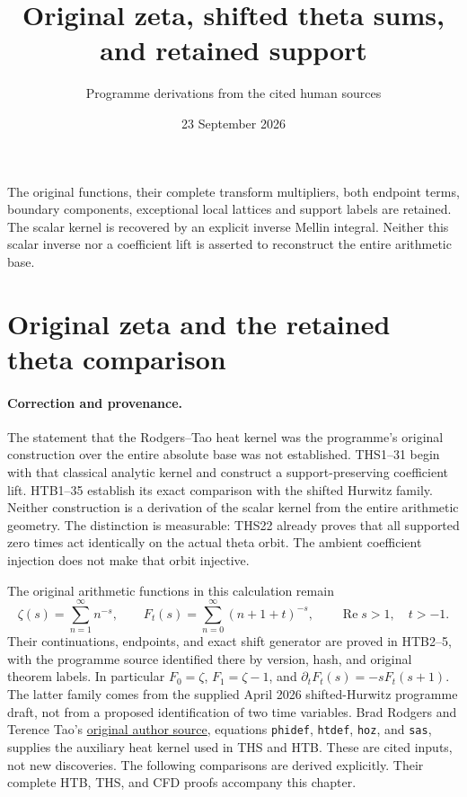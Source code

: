 \documentclass[11pt]{article}
\title{Original zeta, shifted theta sums, and retained support}
\author{Programme derivations from the cited human sources}
\date{23 September 2026}
\theoremstyle{definition}
\begin{document}
\maketitle
The original functions, their complete transform multipliers, both
endpoint terms, boundary components, exceptional local lattices and
support labels are retained. The scalar kernel is recovered by an
explicit inverse Mellin integral. Neither this scalar inverse nor a
coefficient lift is asserted to reconstruct the entire arithmetic base.
\tableofcontents
\clearpage

\section{Original zeta and the retained theta comparison}
\label{sec:original-zeta-theta-correction}

\paragraph{Correction and provenance.}
The statement that the Rodgers--Tao heat kernel was the programme's
original construction over the entire absolute base was not established.
THS1--31 begin with that classical analytic kernel and construct a
support-preserving coefficient lift. HTB1--35 establish its exact
comparison with the shifted Hurwitz family. Neither construction is a
derivation of the scalar kernel from the entire arithmetic geometry.
The distinction is measurable: THS22 already proves that all supported
zero times act identically on the actual theta orbit. The ambient
coefficient injection does not make that orbit injective.

The original arithmetic functions in this calculation remain
\begin{equation}\tag{ZTC1}
 \zeta(s)=\sum_{n=1}^{\infty}n^{-s},\qquad
 F_t(s)=\sum_{n=0}^{\infty}(n+1+t)^{-s},
 \qquad \operatorname{Re}s>1,\quad t>-1.
\end{equation}
Their continuations, endpoints, and exact shift generator are proved in
HTB2--5, with the programme source identified there by version, hash,
and original theorem labels. In particular $F_0=\zeta$,
$F_1=\zeta-1$, and $\partial_tF_t(s)=-sF_t(s+1)$.
The latter family comes from the supplied April 2026 shifted-Hurwitz
programme draft, not from a proposed identification of two time variables.
Brad Rodgers and Terence Tao's
\href{https://arxiv.org/abs/1801.05914v5}{original author source},
equations \texttt{phidef}, \texttt{htdef}, \texttt{hoz}, and
\texttt{sas}, supplies the auxiliary heat kernel used in THS and HTB.
These are cited inputs, not new discoveries. The following comparisons
are derived explicitly. Their complete HTB, THS, and CFD proofs accompany
this chapter.
\end{document}
